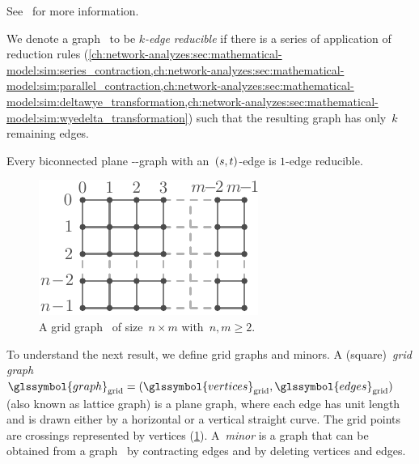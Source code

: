 %
\begin{reductionrule}
    See~\textcite{Sat93} for more information.
    \label{ch:network-analyzes:sec:mathematical-model:sim:polygon_to_chain_reduction}
\end{reductionrule}
% 
We denote a graph~ to be \emph{$k$-edge reducible} if there is
a series of application of reduction rules 
(\cref{ch:network-analyzes:sec:mathematical-model:sim:series_contraction,ch:network-analyzes:sec:mathematical-model:sim:parallel_contraction,ch:network-analyzes:sec:mathematical-model:sim:deltawye_transformation,ch:network-analyzes:sec:mathematical-model:sim:wyedelta_transformation})
such that the resulting graph has only~$k$ remaining edges.
% 
\begin{theorem}
    Every biconnected plane \source-\sink-graph with an~$(s,t)$-edge
    is $1$-edge reducible.
    \label{ch:network-analyzes:sec:mathematical-model:thm:epifanov}
\end{theorem}
%
\begin{figure}%
    \includegraphics[scale=1,page=1]{networkAnalyzes/figures/GridGraph.pdf}
    \caption[A grid graph.]{%
    A grid graph~ of size~$n\times m$ with~$n, m \geq 2$.
    }%
    \label{ch:network-analysis:fig:grid-graph}%
\end{figure}%
% 
\noindent To understand the next result, we define grid graphs and minors. A
(square)~\emph{grid graph}~$
    \glssymbol{graph}_{\mathrm{grid}} 
    = 
    (
    \glssymbol{vertices}_{\mathrm{grid}},
    \glssymbol{edges}_{\mathrm{grid}}
    )
$ (also known as lattice graph) is a plane graph, where each edge has unit
length and is drawn either by a horizontal or a vertical straight curve. The
grid points are crossings represented by vertices
(\cref{ch:network-analysis:fig:grid-graph}). A~\emph{minor} is a graph that can
be obtained from a graph~ by contracting edges and by deleting
vertices and edges.

